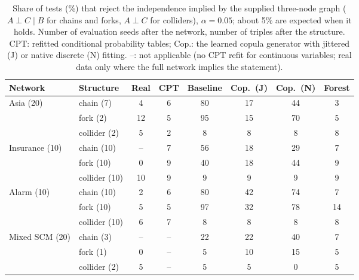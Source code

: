 \documentclass[
  english,
  class=report,
  accentcolor=2c,
  marginpar=false,
  parskip=half-,
  fontsize=11pt,
  ruledheaders=false,
  pdfa=false,
  IMRAD=false,
  thesis={type=master}
]{tudapub}
\begin{document}
\begin{table}[ht]
\caption{Share of tests (\%) that reject the independence implied by the supplied three-node graph ($A \perp C \mid B$ for chains and forks, $A \perp C$ for colliders), $\alpha = 0.05$; about 5\% are expected when it holds. Number of evaluation seeds after the network, number of triples after the structure. CPT: refitted conditional probability tables; Cop.: the learned copula generator with jittered (J) or native discrete (N) fitting. --: not applicable (no CPT refit for continuous variables; real data only where the full network implies the statement).}
\label{tab:ci-checks}
\centering
\small
\begin{tabular}{llcccccc}
\toprule
\textbf{Network} & \textbf{Structure} & \textbf{Real} & \textbf{CPT} & \textbf{Baseline} & \textbf{Cop.\ (J)} & \textbf{Cop.\ (N)} & \textbf{Forest} \\
\midrule
Asia (20) & chain (7) & 4 & 6 & 80 & 17 & 44 & 3 \\
 & fork (2) & 12 & 5 & 95 & 15 & 70 & 5 \\
 & collider (2) & 5 & 2 & 8 & 8 & 8 & 8 \\
\addlinespace
Insurance (10) & chain (10) & -- & 7 & 56 & 18 & 29 & 7 \\
 & fork (10) & 0 & 9 & 40 & 18 & 44 & 9 \\
 & collider (10) & 10 & 9 & 9 & 9 & 9 & 9 \\
\addlinespace
Alarm (10) & chain (10) & 2 & 6 & 80 & 42 & 74 & 7 \\
 & fork (10) & 5 & 5 & 97 & 32 & 78 & 14 \\
 & collider (10) & 6 & 7 & 8 & 8 & 8 & 8 \\
\addlinespace
Mixed SCM (20) & chain (3) & -- & -- & 22 & 22 & 40 & 7 \\
 & fork (1) & 0 & -- & 5 & 10 & 15 & 5 \\
 & collider (2) & 5 & -- & 5 & 5 & 0 & 5 \\
\bottomrule
\end{tabular}
\end{table}
\end{document}
